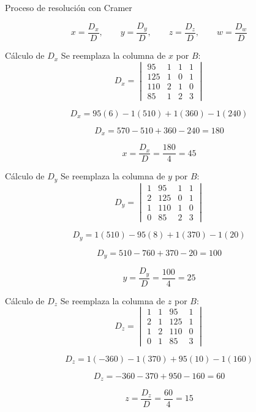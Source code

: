 \documentclass[aspectratio=169]{beamer}
\newcommand{\detm}[1]{\begin{vmatrix}#1\end{vmatrix}}
\begin{document}
\begin{frame}{Proceso de resolución con Cramer}
\begin{center}
\end{center}

\[
x=\frac{D_x}{D},\qquad y=\frac{D_y}{D},\qquad z=\frac{D_z}{D},\qquad w=\frac{D_w}{D}
\]
\end{frame}

\begin{frame}[shrink=6]{Cálculo de $D_x$}
Se reemplaza la columna de $x$ por $B$:
\[
D_x=\detm{
95&1&1&1\\
125&1&0&1\\
110&2&1&0\\
85&1&2&3}
\]

\[
D_x=95(6)-1(510)+1(360)-1(240)
\]

\[
D_x=570-510+360-240=\boxed{180}
\]

\[
x=\frac{D_x}{D}=\frac{180}{4}=\boxed{45}
\]
\end{frame}

\begin{frame}[shrink=8]{Cálculo de $D_y$}
Se reemplaza la columna de $y$ por $B$:
\[
D_y=\detm{
1&95&1&1\\
2&125&0&1\\
1&110&1&0\\
0&85&2&3}
\]

\[
D_y=1(510)-95(8)+1(370)-1(20)
\]

\[
D_y=510-760+370-20=\boxed{100}
\]

\[
y=\frac{D_y}{D}=\frac{100}{4}=\boxed{25}
\]
\end{frame}

\begin{frame}[shrink=8]{Cálculo de $D_z$}
Se reemplaza la columna de $z$ por $B$:
\[
D_z=\detm{
1&1&95&1\\
2&1&125&1\\
1&2&110&0\\
0&1&85&3}
\]

\[
D_z=1(-360)-1(370)+95(10)-1(160)
\]

\[
D_z=-360-370+950-160=\boxed{60}
\]

\[
z=\frac{D_z}{D}=\frac{60}{4}=\boxed{15}
\]
\end{frame}
\end{document}
